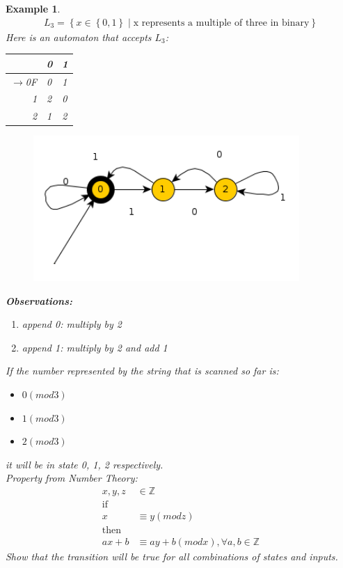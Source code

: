 \documentclass[a4paper]{article}
\newtheorem{example}{Example}
\begin{document}
\begin{example}
    \begin{align*}
        L_3=\left\{ x\in\left\{ 0,1 \right\}\middle | \mbox{x represents a multiple of three in binary} \right\}
    \end{align*}
    Here is an automaton that accepts $L_3$:
    \begin{table}[H]
        \centering
        \begin{tabular}{r|l l}
            & 0 & 1\\\hline
            $\rightarrow$0F & 0 & 1\\
            1 & 2 & 0\\
            2 & 1 & 2
        \end{tabular}
    \end{table}
    \begin{figure}[H]
        \centering
        \includegraphics[width=0.9\textwidth]{example4.png}
    \end{figure}
    \textbf{Observations:}
    \begin{enumerate}
        \item append 0: multiply by 2
        \item append 1: multiply by 2 and add 1
    \end{enumerate}
    If the number represented by the string that is scanned so far is:
    \begin{itemize}
        \item $0 (mod 3)$
        \item $1 (mod 3)$
        \item $2 (mod 3)$
    \end{itemize}
    it will be in state 0, 1, 2 respectively.\\
    Property from Number Theory:
    \begin{align*}
        x,y,z &\in \mathbb{Z}\\
        \mbox{if } \\
        x&\equiv y (mod z)\\
        \mbox{then } \\
        ax+b &\equiv ay+b (mod x),\forall a,b\in\mathbb{Z}
    \end{align*}
Show that the transition will be true for all combinations of states and inputs.
\end{example}
\end{document}
